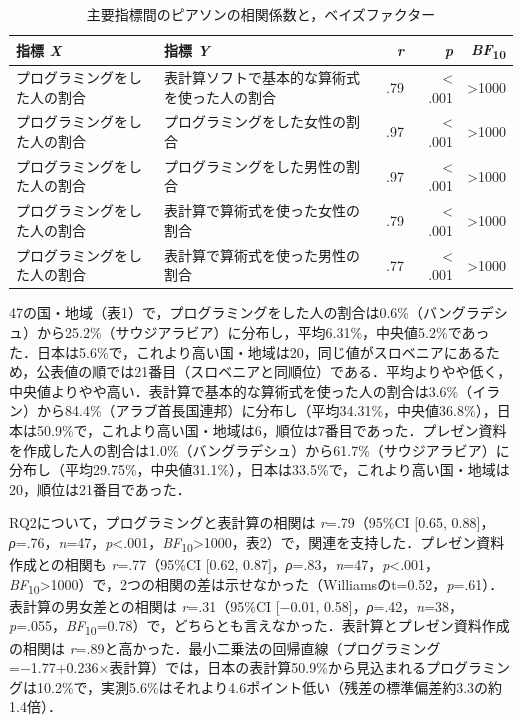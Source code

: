 \documentclass[a4paper,10pt,twocolumn]{ltjsarticle}
\makeatletter
\renewcommand{\section}{\@startsection{section}{1}{\z@}{1.1\Cvs \@plus.4\Cdp \@minus.2\Cdp}{.5\Cvs \@plus.2\Cdp}{\normalfont\gtfamily\bfseries\large}}
\makeatother
\begin{document}
\begin{table}[!t]
\caption{主要指標間のピアソンの相関係数と，ベイズファクター}
\centering\small
\begin{tabular}{>{\raggedright\arraybackslash}p{6.4cm}>{\raggedright\arraybackslash}p{6.4cm}rrr}
\toprule
指標 \textit{X} & 指標 \textit{Y} & \textit{r} & \textit{p} & \textit{BF}\textsubscript{10} \\
\midrule
プログラミングをした人の割合 & 表計算ソフトで基本的な算術式を使った人の割合 & .79 & < .001 & >1000 \\
プログラミングをした人の割合 & プログラミングをした女性の割合 & .97 & < .001 & >1000 \\
プログラミングをした人の割合 & プログラミングをした男性の割合 & .97 & < .001 & >1000 \\
プログラミングをした人の割合 & 表計算で算術式を使った女性の割合 & .79 & < .001 & >1000 \\
プログラミングをした人の割合 & 表計算で算術式を使った男性の割合 & .77 & < .001 & >1000 \\
\bottomrule
\end{tabular}
\par{}
\end{table}
\section{結果}
47の国・地域（表1）で，プログラミングをした人の割合は0.6\%（バングラデシュ）から25.2\%（サウジアラビア）に分布し，平均6.31\%，中央値5.2\%であった．日本は5.6\%で，これより高い国・地域は20，同じ値がスロベニアにあるため，公表値の順では21番目（スロベニアと同順位）である．平均よりやや低く，中央値よりやや高い．表計算で基本的な算術式を使った人の割合は3.6\%（イラン）から84.4\%（アラブ首長国連邦）に分布し（平均34.31\%，中央値36.8\%），日本は50.9\%で，これより高い国・地域は6，順位は7番目であった．プレゼン資料を作成した人の割合は1.0\%（バングラデシュ）から61.7\%（サウジアラビア）に分布し（平均29.75\%，中央値31.1\%），日本は33.5\%で，これより高い国・地域は20，順位は21番目であった．

RQ2について，プログラミングと表計算の相関は \textit{r}=.79（95\%CI [0.65, 0.88]，\textit{ρ}=.76，\textit{n}=47，\textit{p}<.001，\textit{BF}\textsubscript{10}>1000，表2）で，関連を支持した．プレゼン資料作成との相関も \textit{r}=.77（95\%CI [0.62, 0.87]，\textit{ρ}=.83，\textit{n}=47，\textit{p}<.001，\textit{BF}\textsubscript{10}>1000）で，2つの相関の差は示せなかった（Williamsのt=0.52，\textit{p}=.61）．表計算の男女差との相関は \textit{r}=.31（95\%CI [−0.01, 0.58]，\textit{ρ}=.42，\textit{n}=38，\textit{p}=.055，\textit{BF}\textsubscript{10}=0.78）で，どちらとも言えなかった．表計算とプレゼン資料作成の相関は \textit{r}=.89と高かった．最小二乗法の回帰直線（プログラミング=−1.77+0.236×表計算）では，日本の表計算50.9\%から見込まれるプログラミングは10.2\%で，実測5.6\%はそれより4.6ポイント低い（残差の標準偏差約3.3の約1.4倍）．
\end{document}
